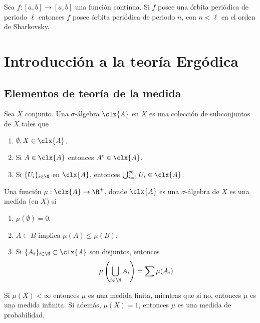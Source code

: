 \documentclass[	docname= Sistemas\ Din\'amicos,
				finished=1,
				semester=1,
				year=2017,
				professor=Godofredo\ Iommi,
				sigla=MAT2565]{apunte}
\begin{document}
\begin{teo}[Sharkovsky '61] Sea $f: [a,b] \to [a,b]$ una función continua. Si $f$ posee una órbita periódica de periodo $\ell$ entonces $f$ posee órbita periódica de periodo $n$, con $n < \ell$ en el orden de Sharkovsky.
\end{teo}

\newpage
\section{Introducción a la teoría Ergódica}

\subsection{Elementos de teoría de la medida}
\begin{defn} Sea $X$ conjunto. Una $\sigma$-álgebra $\clx{A}$ en $X$ es una colección de subconjuntos de $X$ tales que
	\begin{enumerate}[1)]
		\item $\emptyset, X \in \clx{A}$.
		\item Si $A \in \clx{A}$ entonces $A^{c} \in \clx{A}$.
		\item Si $\{U_{i}\}_{i \in \N}$ en $\clx{A}$, entonces $\bigcup_{i=1}^{\infty} U_{i} \in \clx{A}$.
	\end{enumerate}
\end{defn}

\begin{defn} Una función $\mu: \clx{A} \to \R^{+}$, donde $\clx{A}$ es una $\sigma$-álgebra de $X$ es una medida (en $X$) si
	\begin{enumerate}
		\item $\mu(\emptyset) = 0$.
		\item $A \subset B$ implica $\mu(A) \leq \mu(B)$.
		\item Si $\{A_{i}\}_{i \in \N} \subset \clx{A}$ son disjuntos, entonces
				$$\mu\left(\bigcup_{i \in \N} A_{i}\right) = \sum \mu(A_{i})$$
	\end{enumerate}
\end{defn}

\begin{defn} Si $\mu(X) < \infty$ entonces $\mu$ es una medida finita, mientras que si no, entonces $\mu$ es una medida infinita. Si además, $\mu(X) = 1$, entonces $\mu$ es una medida de probabilidad.
\end{defn}
\end{document}
